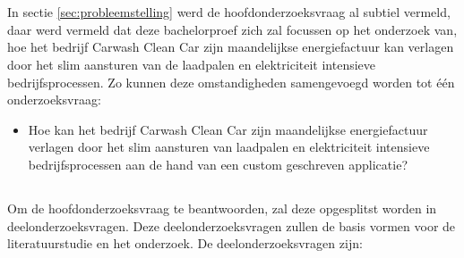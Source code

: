 \section{}%
\label{sec:onderzoeksvraag}

\subsection{}
\label{subsec:hoofdonderzoeksvraag}

In sectie \ref{sec:probleemstelling} werd de hoofdonderzoeksvraag al subtiel vermeld, daar werd vermeld dat deze bachelorproef zich zal focussen op het onderzoek van, hoe het bedrijf Carwash Clean Car zijn maandelijkse energiefactuur kan verlagen door het slim aansturen van de laadpalen en elektriciteit intensieve bedrijfsprocessen. Zo kunnen deze omstandigheden samengevoegd worden tot één onderzoeksvraag:

\begin{itemize}
  \item Hoe kan het bedrijf Carwash Clean Car zijn maandelijkse energiefactuur verlagen door het slim aansturen van laadpalen en elektriciteit intensieve bedrijfsprocessen aan de hand van een custom geschreven applicatie?
\end{itemize}

\pagebreak

\subsection{}
\label{subsec:deelonderzoeksvragen}

Om de hoofdonderzoeksvraag te beantwoorden, zal deze opgesplitst worden in deelonderzoeksvragen. Deze deelonderzoeksvragen zullen de basis vormen voor de literatuurstudie en het onderzoek. De deelonderzoeksvragen zijn:

